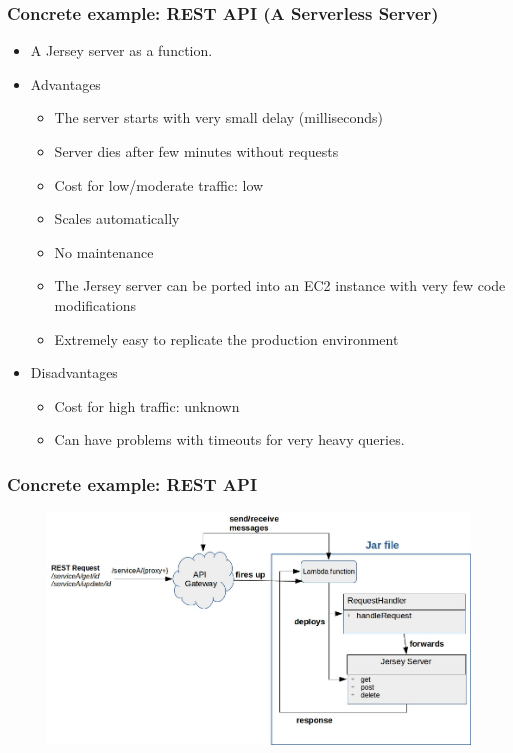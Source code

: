 \documentclass{beamer}
\begin{document}
\begin{frame}
\frametitle{Concrete example: REST API (A Serverless Server)}
\begin{itemize}
\item A Jersey server as a function.
\item Advantages
\begin{itemize}
\item The server starts with very small delay (milliseconds)
\item Server dies after few minutes without requests
\item Cost for low/moderate traffic: low
\item Scales automatically
\item No maintenance
\item The Jersey server can be ported into an EC2 instance with very few code modifications
\item Extremely easy to replicate the production environment
\end{itemize}
\item Disadvantages
\begin{itemize}
\item Cost for high traffic: unknown 
\item Can have problems with timeouts for very heavy queries. 
\end{itemize}

\end{itemize}
\end{frame}

\begin{frame}
\frametitle{Concrete example: REST API}
\begin{figure}
\includegraphics[scale=0.3]{rest.jpeg}
\end{figure}

\end{frame}
\end{document}
